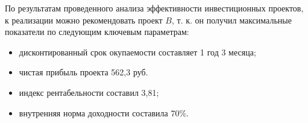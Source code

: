 \begin{table}[!h]
		\label{final11}
	\caption{Показатели эффективности инвестиционных проектов}
\end{table}

По результатам проведенного анализа эффективности инвестиционных проектов, к реализации можно рекомендовать проект $B$, т. к. он получил максимальные показатели по следующим ключевым параметрам:\begin{itemize}
	\item дисконтированный срок окупаемости составляет 1 год 3 месяца;
	\item чистая прибыль проекта 562,3 руб.
	\item индекс рентабельности составил  3,81;
	\item внутренняя норма доходности составила 70\%.
\end{itemize}